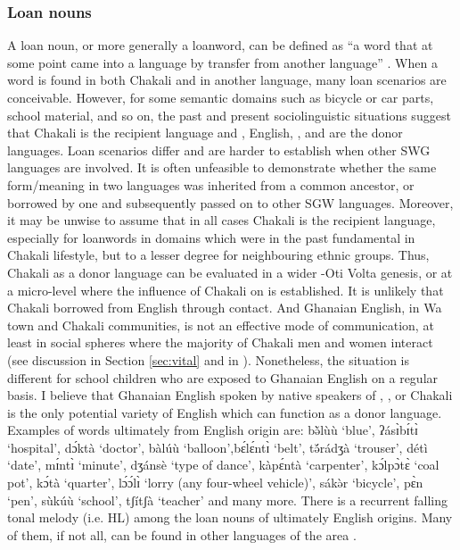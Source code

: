 \begin{exe}
\begin{exe}
\begin{exe}
\begin{exe}
\begin{exe}
\begin{exe}
\begin{exe}
\begin{exe}
\subsubsection{Loan nouns}
\label{sec:GRM-borr-noun}

A loan noun,  or more generally a loanword, can be defined as  ``a word that at some point came into a language by transfer from another language'' \citep[58]{Hasp08}.  When a word is found in both Chakali and in another language, many loan scenarios are conceivable. However,  for some semantic domains such as   bicycle or car parts, school material, and so on, the past and present sociolinguistic situations  suggest that Chakali is the recipient language and , English, , and   are the donor languages.  Loan scenarios differ and are harder to establish when other SWG languages are involved. It is often unfeasible to demonstrate whether the same form/meaning in two languages was inherited from a common ancestor, or  borrowed by one and subsequently passed on to other SGW languages. Moreover, it may be unwise to assume that in all cases Chakali is  the recipient language, especially for loanwords in domains which  were in the past fundamental in Chakali lifestyle,  but to a lesser degree for neighbouring ethnic groups. Thus, Chakali as a donor language can be evaluated in a wider -Oti Volta genesis, or  at a micro-level where the influence of Chakali on  is established. It is unlikely that Chakali borrowed from English through contact. And Ghanaian English, in Wa town and Chakali communities,  is not an effective mode of communication, at least in social spheres where the majority of  Chakali men and women interact (see discussion in Section \ref{sec:vital} and in \citealt{brin15c}).  Nonetheless, the situation is different for school children  who are exposed to Ghanaian English on a regular basis. I believe that Ghanaian English spoken by native speakers of , , or Chakali  is the only potential variety of English which can function as a donor language. Examples of words ultimately  from English origin are: {\sls bə̆̀lùù} `blue', {\sls ʔásɪ̀bɪ́tɪ̀} `hospital', {\sls dɔ́ktà} `doctor', {\sls bàlúù} `balloon',{\sls bɛ́lɛ́ntɪ̀} `belt',  {\sls tə̆́rádʒà} `trouser',  {\sls détì} `date', {\sls mɪ́ntɪ̀} `minute',   {\sls dʒánsè} `type of dance',  {\sls kàpɛ́ntà} `carpenter', {\sls kɔ́lpɔ̀tɛ̀} `coal pot', {\sls kɔ́tà} `quarter', {\sls lɔ́ɔ́lɪ̀} `lorry (any four-wheel vehicle)',   {\sls sákə̀r} `bicycle',  {\sls pɛ̀n} `pen', {\sls sùkúù} `school',   {\sls tʃítʃà} `teacher' and many more.  There is a recurrent falling tonal melody (i.e. HL) among the loan nouns of  ultimately English origins. Many of them,  if not all, can be found in other languages of the area \citep{sisa75, daku07}. 


\end{exe}
\end{exe}
\end{exe}
\end{exe}
\end{exe}
\end{exe}
\end{exe}
\end{exe}
